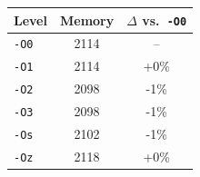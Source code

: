 \begin{tabular*}{\columnwidth}{@{\extracolsep\fill}lcc@{\extracolsep\fill}}
\toprule
\textbf{Level} & \textbf{Memory} & \textbf{$\Delta$ vs.\ \texttt{-O0}} \\
\midrule
\texttt{-O0} & 2114 & -- \\
\texttt{-O1} & 2114 & +0\% \\
\texttt{-O2} & 2098 & -1\% \\
\texttt{-O3} & 2098 & -1\% \\
\texttt{-Os} & 2102 & -1\% \\
\texttt{-Oz} & 2118 & +0\% \\
\bottomrule
\end{tabular*}
